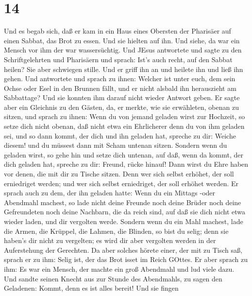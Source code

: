 \hypertarget{section-13}{%
\section{14}\label{section-13}}

 Und es begab sich, daß er kam in ein Haus eines Obersten
der Pharisäer auf einen Sabbat, das Brot zu essen. Und sie hielten auf
ihn.  Und siehe, da war ein Mensch vor ihm der war
wassersüchtig.  Und JEsus antwortete und sagte zu den
Schriftgelehrten und Pharisäern und sprach: Ist's auch recht, auf den
Sabbat heilen?  Sie aber schwiegen stille. Und er griff ihn
an und heilete ihn und ließ ihn gehen.  Und antwortete und
sprach zu ihnen: Welcher ist unter euch, dem sein Ochse oder Esel in den
Brunnen fällt, und er nicht alsbald ihn herauszieht am Sabbattage?
 Und sie konnten ihm darauf nicht wieder Antwort geben.
 Er sagte aber ein Gleichnis zu den Gästen, da, er merkte,
wie sie erwähleten, obenan zu sitzen, und sprach zu ihnen: 
Wenn du von jemand geladen wirst zur Hochzeit, so setze dich nicht
obenan, daß nicht etwa ein Ehrlicherer denn du von ihm geladen sei,
 und so dann kommt, der dich und ihn geladen hat, spreche zu
dir: Weiche diesem! und du müssest dann mit Scham untenan sitzen.
 Sondern wenn du geladen wirst, so gehe hin und setze dich
untenan, auf daß, wenn da kommt, der dich geladen hat, spreche zu dir:
Freund, rücke hinauf! Dann wirst du Ehre haben vor denen, die mit dir zu
Tische sitzen.  Denn wer sich selbst erhöhet, der soll
erniedriget werden; und wer sich selbst erniedriget, der soll erhöhet
werden.  Er sprach auch zu dem, der ihn geladen hatte: Wenn
du ein Mittags -oder Abendmahl machest, so lade nicht deine Freunde noch
deine Brüder noch deine Gefreundeten noch deine Nachbarn, die da reich
sind, auf daß sie dich nicht etwa wieder laden, und dir vergolten werde.
 Sondern wenn du ein Mahl machest, lade die Armen, die
Krüppel, die Lahmen, die Blinden,  so bist du selig; denn
sie haben's dir nicht zu vergelten; es wird dir aber vergolten werden in
der Auferstehung der Gerechten.  Da aber solches hörete
einer, der mit zu Tisch saß, sprach er zu ihm: Selig ist, der das Brot
isset im Reich GOttes.  Er aber sprach zu ihm: Es war ein
Mensch, der machte ein groß Abendmahl und lud viele dazu. 
Und sandte seinen Knecht aus zur Stunde des Abendmahls, zu sagen den
Geladenen: Kommt, denn es ist alles bereit!  Und sie fingen
